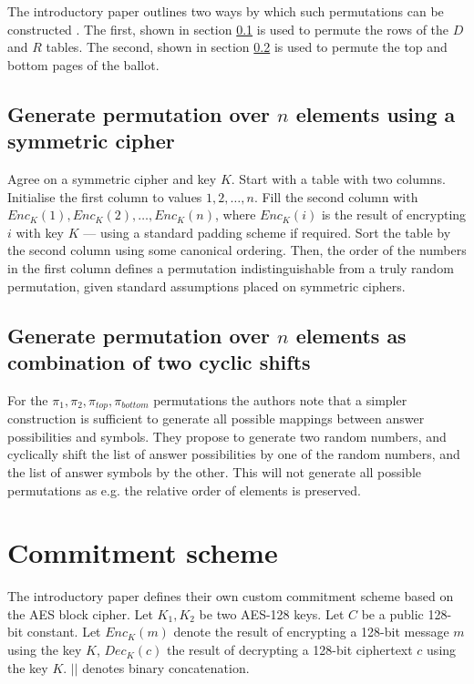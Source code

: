 The introductory paper outlines two ways by which such permutations can be
constructed \autocite[section 8]{fisherPunchscanIntroductionSystem2006}. The
first, shown in section \ref{sec:permutations_via_symmetric_cipher} is used to
permute the rows of the $D$ and $R$ tables. The second, shown in section
\ref{sec:permutations_via_shifts} is used to permute the top and bottom pages
of the ballot.

\subsection{Generate permutation over $n$ elements using a symmetric cipher}
\label{sec:permutations_via_symmetric_cipher}

Agree on a symmetric cipher and key $K$. Start with a table with two columns.
Initialise the first column to values $1, 2, \ldots, n$. Fill the second column
with $Enc_K(1), Enc_K(2), \ldots, Enc_K(n)$, where $Enc_K(i)$ is the result of
encrypting $i$ with key $K$ --- using a standard padding scheme if required.
Sort the table by the second column using some canonical ordering. Then, the
order of the numbers in the first column defines a permutation
indistinguishable from a truly random permutation, given standard assumptions
placed on symmetric ciphers.

\subsection{Generate permutation over $n$ elements as combination of two cyclic shifts}
\label{sec:permutations_via_shifts}

For the $\pi_1, \pi_2, \pi_{top}, \pi_{bottom}$ permutations the authors note
that a simpler construction is sufficient to generate all possible mappings
between answer possibilities and symbols. They propose to generate two random
numbers, and cyclically shift the list of answer possibilities by one of the
random numbers, and the list of answer symbols by the other. This will not
generate all possible permutations as e.g. the relative order of elements is
preserved.

\section{Commitment scheme}
\label{sec:commitment_scheme}

The introductory paper defines their own custom commitment scheme based on the
AES block cipher\autocite[section 9]{fisherPunchscanIntroductionSystem2006}.
Let $K_1, K_2$ be two AES-128 keys. Let $C$ be a public 128-bit constant. Let
$Enc_K(m)$ denote the result of encrypting a 128-bit message $m$ using the key
$K$, $Dec_K(c)$ the result of decrypting a 128-bit ciphertext $c$ using the key
$K$. $||$ denotes binary concatenation.

